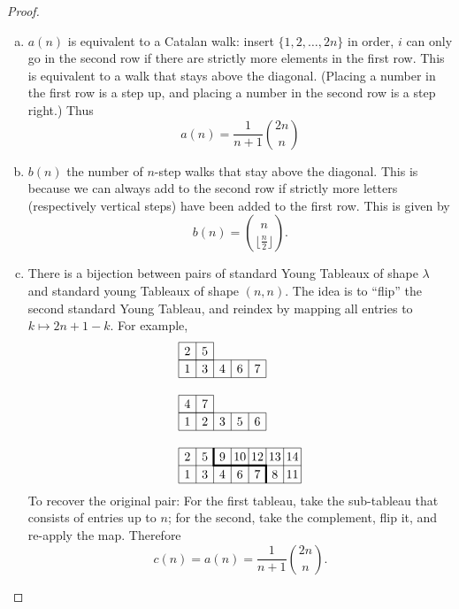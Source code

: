 \documentclass{article}
\newcommand{\set}[1]{\{ #1 \}}
\begin{document}
\begin{proof} ~
  \begin{enumerate}[(a)]
    \item $a(n)$ is equivalent to a Catalan walk: insert $\set{1, 2, \hdots, 2n}$ in
    order, $i$ can only go in the second row if there are strictly more
    elements in the first row. This is equivalent to a walk that stays above
    the diagonal. (Placing a number in the first row is a step up, and
    placing a number in the second row is a step right.) Thus \[
      a(n) = \frac{1}{n+1}\binom{2n}{n}
    \]
    \item $b(n)$ the number of $n$-step walks that stay above the diagonal. This is
    because we can always add to the second row if strictly more
    letters (respectively vertical steps) have been added to the first row.
    This is given by \[
      b(n) = \binom{n}{\lfloor \frac n 2 \rfloor}.
    \]
    \item
    There is a bijection between pairs of standard Young Tableaux of shape
    $\lambda$ and standard young Tableaux of shape $(n, n)$. The idea is to
    ``flip'' the second standard Young Tableau, and reindex by mapping all
    entries to $k \mapsto 2n + 1 - k$. For example, \[
      \begin{tikzpicture}[scale=0.5]
        \draw (0,0) grid (5,1);
        \draw (0,1) grid (2,2);

        \draw (0,3) grid (5,4);
        \draw (0,4) grid (2,5);

        \draw (0,-3) grid (7,-1);
        \draw[ultra thick] (2,-1)--(2,-2)--(5,-2)--(5,-3);
        \foreach \i/\x/\y in {
          1/3/0, 2/4/0, 3/3/1, 4/3/2, 5/4/1, 6/3/3, 7/3/4,
          1/0/0, 4/1/0, 2/0/1, 3/0/2, 7/1/1, 5/0/3, 6/0/4,
          1/-3/0, 2/-2/0, 3/-3/1, 4/-3/2, 5/-2/1, 6/-3/3, 7/-3/4,
          8/-3/5,11/-3/6, 9/-2/2,10/-2/3,12/-2/4,13/-2/5,14/-2/6
        } {
          \node at (\y + 0.5, \x + 0.5) {\i};
        }
      \end{tikzpicture}
    \] To recover the original pair: For the first tableau, take the sub-tableau that
    consists of entries up to $n$; for the second, take the complement, flip it, and
    re-apply the map. Therefore \[
      c(n) = a(n) = \frac{1}{n+1}\binom{2n}{n}.
    \]
  \end{enumerate}
\end{proof}
\end{document}
